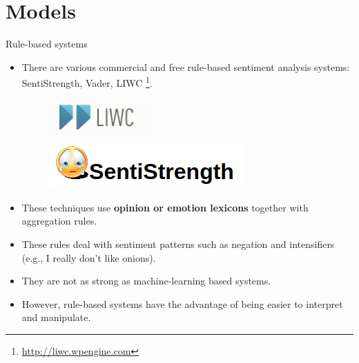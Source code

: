 \documentclass[handout]{beamer}
\begin{document}
\section{Models}

\begin{frame}{Rule-based systems}
\begin{scriptsize}
\begin{itemize}
 \item There are various commercial and free rule-based sentiment analysis systems: SentiStrength, Vader, LIWC \footnote{\url{http://liwc.wpengine.com}}.
 
      \begin{figure}[h]
        	\includegraphics[scale = 0.25]{pics/liwc.png}
        	\includegraphics[scale = 0.25]{pics/sentistrength.png}
        \end{figure} 
 
 
 \item These techniques use \textbf{opinion or emotion lexicons} together with aggregation rules.
 
 \item These rules deal with sentiment patterns such as negation and intensifiers (e.g., I really don't like onions). 
  \item They are not as strong as machine-learning based systems.
  
  \item However, rule-based systems have the advantage of being easier to interpret and manipulate. 
\end{itemize}
\end{scriptsize}
 
 

\end{frame}
\end{document}
